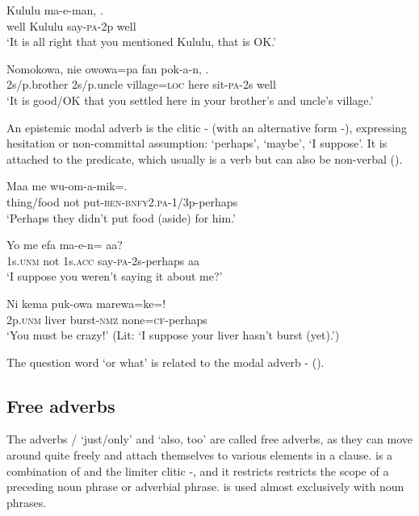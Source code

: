 \ea%
\label{ex:x515}
\gll {} Kululu ma-e-man, . \\
well Kululu say-\textsc{pa}-2p well\\
\glt`It is all right that you mentioned Kululu, that is OK.'
\z

\ea%
\label{ex:x516}
\gll Nomokowa, nie owowa=pa fan pok-a-n, . \\
2s/p.brother 2s/p.uncle village=\textsc{loc} here sit-\textsc{pa}-2s well\\
\glt`It is good/OK that you settled here in your brother's and uncle's village.'
\z

An epistemic modal adverb is the clitic - (with an alternative form -), expressing hesitation or non-committal assumption: `perhaps', `maybe', `I suppose'. It is attached to the predicate, which usually is a verb but can also be non-verbal ().

\ea%
\label{ex:x517}
\gll Maa me wu-om-a-mik=. \\
thing/food not put-\textsc{ben}-\textsc{bnfy}2.\textsc{pa}-1/3p-perhaps\\
\glt`Perhaps they didn't put food (aside) for him.'
\z

\ea%
\label{ex:x518}
\gll Yo me efa ma-e-n= aa? \\
1s.\textsc{unm} not 1s.\textsc{acc} say-\textsc{pa}-2s-perhaps aa\\
\glt`I suppose you weren't saying it about me?'
\z

\ea%
\label{ex:x519}
\gll Ni kema puk-owa marewa=ke=! \\
2p.\textsc{unm} liver burst-\textsc{nmz} none=\textsc{cf}-perhaps\\
\glt`You must be crazy!' (Lit: `I suppose your liver hasn't burst (yet).')
\z

The question word  `or what' is related to the modal adverb - ().

\subsection{Free adverbs}
{}
The adverbs \textstyleStyleVernacularWordsItalic{)}/ `just/only' and  `also, too' are called free adverbs, as they can move around quite freely and attach themselves to various elements in a clause.  is a combination of  and the limiter clitic \nobreakdash-, and it restricts restricts the scope of a preceding noun phrase or adverbial phrase.  is used almost exclusively with noun phrases.

